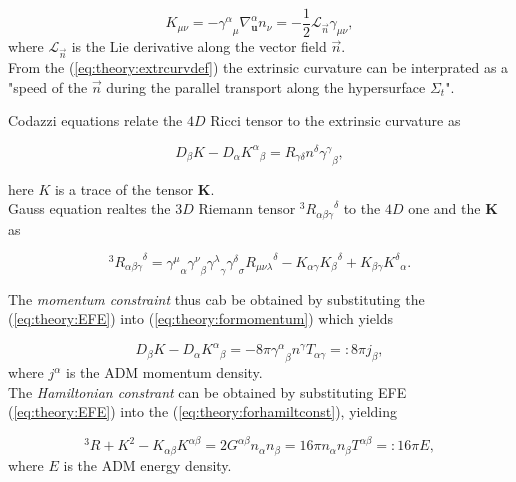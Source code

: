 \documentclass[11pt,a4paper,headinclude=true,DIV=14,BCOR=8mm,chapterprefix,listof=totoc,twoside,openright,abstracton]{scrbook}
\begin{document}
\begin{equation}
    K_{\mu\nu} = -{\gamma^{\alpha}}_{\mu}\nabla_{\boldsymbol{u}}^{\alpha} n_{\nu} = -\frac{1}{2}\mathcal{L}_{\vec{n}}\gamma_{\mu\nu},
    \label{eq:theory:extrcurvdef}
\end{equation}
where $\mathcal{L}_{\vec{n}}$ is the Lie derivative along the vector field $\vec{n}$. \\
From the (\ref{eq:theory:extrcurvdef}) the extrinsic curvature can be interprated as a "speed of the $\vec{n}$ during the parallel transport along the hypersurface $\Sigma_t$".

Codazzi equations relate the $4D$ Ricci tensor to the extrinsic curvature as

\begin{equation}
    D_{\beta}K-D_{\alpha}{K^{\alpha}}_{\beta}=R_{\gamma\delta}n^{\delta}{\gamma^{\gamma}}_{\beta},
    \label{eq:theory:formomentum}
\end{equation}

here $K$ is a trace of the tensor $\boldsymbol{K}$. \\

Gauss equation realtes the $3D$ Riemann tensor $^3{R_{\alpha\beta\gamma}}^{\delta}$ to the $4D$ one and the $\boldsymbol{K}$ as

\begin{equation}
    ^3{R_{\alpha\beta\gamma}}^{\delta} = {\gamma^{\mu}}_{\alpha}{\gamma^{\nu}}_{\beta}{\gamma^{\lambda}}_{\gamma}{\gamma^{\delta}}_{\sigma}{R_{\mu\nu\lambda}}^{\delta}-K_{\alpha\gamma}{K_{\beta}}^{\delta}+K_{\beta\gamma}{K^{\delta}}_{\alpha}.
    \label{eq:theory:forhamiltconst}
\end{equation}

The \textit{momentum constraint} thus cab be obtained by substituting the (\ref{eq:theory:EFE}) into  (\ref{eq:theory:formomentum}) which yields

\begin{equation}
    D_{\beta}K-D_{\alpha}{K^{\alpha}}_{\beta} = -8\pi{\gamma^{\alpha}}_{\beta} n^{\gamma}T_{\alpha\gamma}=:8\pi j_{\beta},
    \label{eq:theory:momconstraint}
\end{equation}
where $j^{\alpha}$ is the ADM momentum density. \\

The \textit{Hamiltonian constrant} can be obtained by substituting EFE (\ref{eq:theory:EFE}) into the (\ref{eq:theory:forhamiltconst}), yielding 

\begin{equation}
    ^3 R+ K^2 - K_{\alpha\beta}K^{\alpha\beta} = 2G^{\alpha\beta}n_{\alpha}n_{\beta} = 16\pi n_{\alpha}n_{\beta} T^{\alpha\beta} =: 16\pi E,
    \label{eq:theory:hamilconstraint}
\end{equation}
where $E$ is the ADM energy density. \\
\end{document}
